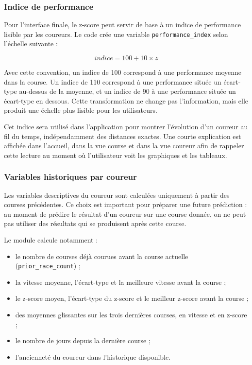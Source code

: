 \documentclass[12pt,a4paper]{article}
\begin{document}
\subsubsection{Indice de performance}

Pour l'interface finale, le z-score peut servir de base à un indice de performance lisible par les coureurs. Le code crée une variable \texttt{performance\_index} selon l'échelle suivante :

\[
indice = 100 + 10 \times z
\]

Avec cette convention, un indice de 100 correspond à une performance moyenne dans la course. Un indice de 110 correspond à une performance située un écart-type au-dessus de la moyenne, et un indice de 90 à une performance située un écart-type en dessous. Cette transformation ne change pas l'information, mais elle produit une échelle plus lisible pour les utilisateurs.

Cet indice sera utilisé dans l'application pour montrer l'évolution d'un coureur au fil du temps, indépendamment des distances exactes. Une courte explication est affichée dans l'accueil, dans la vue course et dans la vue coureur afin de rappeler cette lecture au moment où l'utilisateur voit les graphiques et les tableaux.

\subsubsection{Variables historiques par coureur}

Les variables descriptives du coureur sont calculées uniquement à partir des courses précédentes. Ce choix est important pour préparer une future prédiction : au moment de prédire le résultat d'un coureur sur une course donnée, on ne peut pas utiliser des résultats qui se produisent après cette course.

Le module calcule notamment :

\begin{itemize}
    \item le nombre de courses déjà courues avant la course actuelle (\texttt{prior\_race\_count}) ;
    \item la vitesse moyenne, l'écart-type et la meilleure vitesse avant la course ;
    \item le z-score moyen, l'écart-type du z-score et le meilleur z-score avant la course ;
    \item des moyennes glissantes sur les trois dernières courses, en vitesse et en z-score ;
    \item le nombre de jours depuis la dernière course ;
    \item l'ancienneté du coureur dans l'historique disponible.
\end{itemize}
\end{document}
